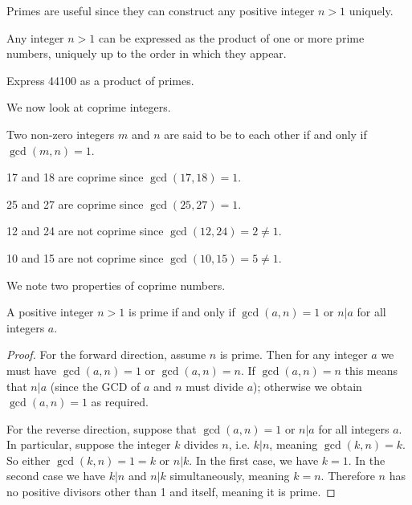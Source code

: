 Primes are useful since they can construct any positive integer $n>1$ uniquely.

\begin{theorem}\label{thrm-fundamental-theorem-of-arithmetic}
    Any integer $n > 1$ can be expressed as the product of one or more prime numbers, uniquely up to the order in which they appear.
\end{theorem}

\begin{exercise}
    Express 44100 as a product of primes.
\end{exercise}

We now look at coprime integers.
\begin{definition}
    Two non-zero integers $m$ and $n$ are said to be  to each other if and only if $\gcd(m, n) = 1$.
\end{definition}
\begin{example}
    17 and 18 are coprime since $\gcd(17, 18) = 1$.
\end{example}
\begin{example}
    25 and 27 are coprime since $\gcd(25, 27) = 1$.
\end{example}
\begin{example}
    12 and 24 are not coprime since $\gcd(12, 24) = 2 \neq 1$.
\end{example}
\begin{example}
    10 and 15 are not coprime since $\gcd(10, 15) = 5 \neq 1$.
\end{example}

We note two properties of coprime numbers.
\begin{proposition}\label{prop-prime-is-coprime-or-divisor}
    A positive integer $n > 1$ is prime if and only if $\gcd(a,n) = 1$ or $n \vert a$ for all integers $a$.
\end{proposition}
\begin{proof}
    For the forward direction, assume $n$ is prime. Then for any integer $a$ we must have $\gcd(a, n) = 1$ or $\gcd(a, n) = n$. If $\gcd(a,n) = n$ this means that $n \vert a$ (since the GCD of $a$ and $n$ must divide $a$); otherwise we obtain $\gcd(a,n) = 1$ as required.

    For the reverse direction, suppose that $\gcd(a,n) = 1$ or $n \vert a$ for all integers $a$. In particular, suppose the integer $k$ divides $n$, i.e. $k \vert n$, meaning $\gcd(k, n) = k$. So either $\gcd(k,n) = 1 = k$ or $n \vert k$. In the first case, we have $k = 1$. In the second case we have $k \vert n$ and $n \vert k$ simultaneously, meaning $k = n$. Therefore $n$ has no positive divisors other than 1 and itself, meaning it is prime.
\end{proof}

